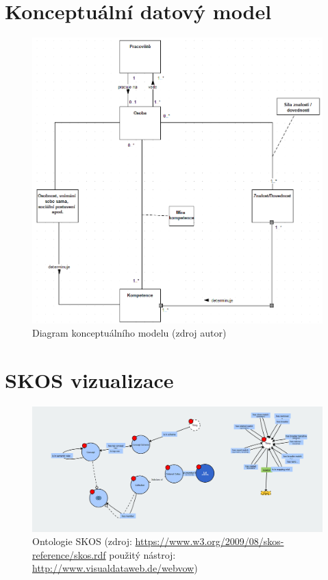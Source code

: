 
\appendix
\chapter{Konceptuální datový model}
\begin{figure}[htbp!]
	\includegraphics[width=\linewidth]{img/data_diagram.png}
	\caption{Diagram konceptuálního modelu (zdroj autor)}
	\label{fig:conceptual_appendix}
\end{figure}


\chapter{SKOS vizualizace}
\begin{figure}
	\includegraphics[width=0.9\linewidth]{img/SKOS-ontology.png}
	\caption{Ontologie SKOS (zdroj: \url{https://www.w3.org/2009/08/skos-reference/skos.rdf} použitý nástroj: \url{http://www.visualdataweb.de/webvow})}
	\label{fig:SKOS-ontology}
\end{figure}

